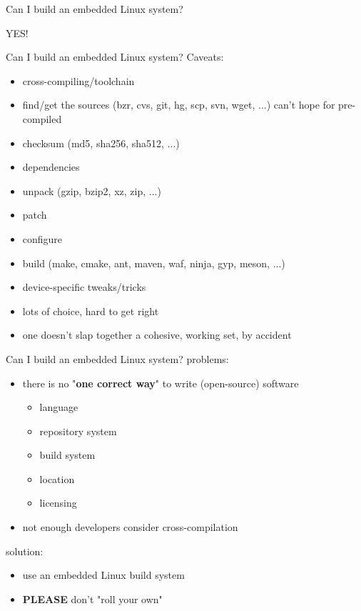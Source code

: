 \documentclass[aspectratio=169,obeyspaces,spaces,hyphens,dvipsnames]{beamer}
\begin{document}
\begin{frame}{Can I build an embedded Linux system?}
  \begin{center}
    \huge YES!
  \end{center}
\end{frame}

\begin{frame}{Can I build an embedded Linux system?}
  Caveats:
  \begin{itemize}
    \item cross-compiling/toolchain
    \item find/get the sources (bzr, cvs, git, hg, scp, svn, wget, ...) can't hope for pre-compiled
    \item checksum (md5, sha256, sha512, ...)
    \item dependencies
    \item unpack (gzip, bzip2, xz, zip, ...)
    \item patch
    \item configure
    \item build (make, cmake, ant, maven, waf, ninja, gyp, meson, ...)
    \item device-specific tweaks/tricks
    \item lots of choice, hard to get right
    \item one doesn't slap together a cohesive, working set, by accident
  \end{itemize}
\end{frame}

\begin{frame}{Can I build an embedded Linux system?}
  problems:
  \begin{itemize}
    \item there is no "{\bf one correct way}" to write (open-source) software
    \begin{itemize}
      \item language
      \item repository system
      \item build system
      \item location
      \item licensing
    \end{itemize}
    \item not enough developers consider cross-compilation
  \end{itemize}
  solution:
  \begin{itemize}
    \item use an embedded Linux build system
    \item {\bf PLEASE} don't "roll your own"
  \end{itemize}
\end{frame}
\end{document}
